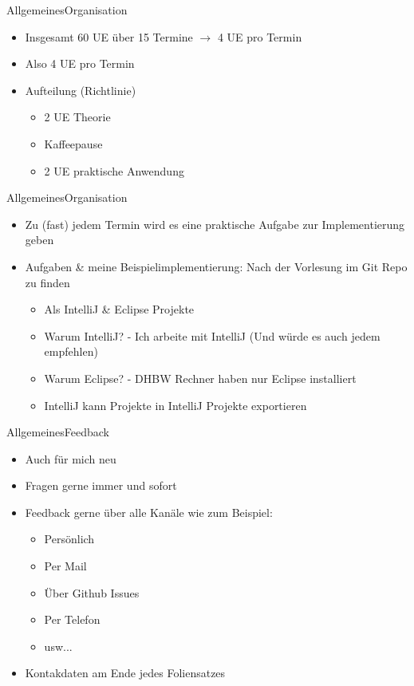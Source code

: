 \begin{frame}{Allgemeines}{Organisation}
	\begin{itemize}
		\item Insgesamt 60 UE über 15 Termine $\rightarrow$ 4 UE pro Termin
		\item Also 4 UE pro Termin
		\item Aufteilung (Richtlinie)
		\begin{itemize}
			\item 2 UE Theorie
			\item Kaffeepause
			\item 2 UE praktische Anwendung
		\end{itemize}
	\end{itemize}
\end{frame}

\begin{frame}{Allgemeines}{Organisation}
	\begin{itemize}
		\item Zu (fast) jedem Termin wird es eine praktische Aufgabe zur Implementierung geben
		\item Aufgaben \& meine Beispielimplementierung: Nach der Vorlesung im Git Repo zu finden
		\begin{itemize}
			\item Als IntelliJ \& Eclipse Projekte
			\item Warum IntelliJ? - Ich arbeite mit IntelliJ (Und würde es auch jedem empfehlen)
			\item Warum Eclipse? - DHBW Rechner haben nur Eclipse installiert
			\item IntelliJ kann Projekte in IntelliJ Projekte exportieren
		\end{itemize}
	\end{itemize}
\end{frame}

\begin{frame}{Allgemeines}{Feedback}
	\begin{itemize}
		\item Auch für mich neu
		\item Fragen gerne immer und sofort
		\item Feedback gerne über alle Kanäle wie zum Beispiel:
		\begin{itemize}
			\item Persönlich
			\item Per Mail
			\item Über Github Issues
			\item Per Telefon
			\item usw...
		\end{itemize}
		\item Kontakdaten am Ende jedes Foliensatzes
	\end{itemize}
\end{frame}

